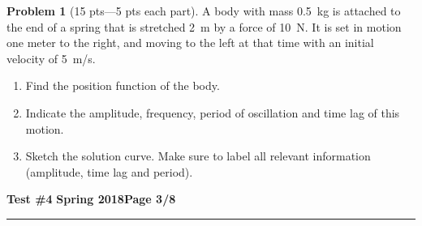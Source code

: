 \documentclass[12pt]{article}
\theoremstyle{definition}
\newtheorem{problem}{Problem}
\begin{document}
\bigskip
\begin{problem}[15 pts---5 pts each part]
A body with mass 0.5~kg is attached to the end of a spring that is stretched 2~m by a force of 10~N.  It is set in motion one meter to the right, and moving to the left at that time with an initial velocity of 5~m/s.
\begin{enumerate}
  \item Find the position function of the body.
  \vspace{4cm}
  \begin{flushright}
  \end{flushright}
  \item Indicate the amplitude, frequency, period of oscillation and time lag of this motion.
  \vspace{4cm}
  \begin{flushright}
  \end{flushright}
  \item Sketch the solution curve.  Make sure to label all relevant information (amplitude, time lag and period).
\end{enumerate}
\end{problem} 

\newpage

\hfill{\large\bf Test \#4}\hfill{\large\bf
  Spring 2018}\hfill{\large\bf Page 3/8}\hrule
\end{document}
